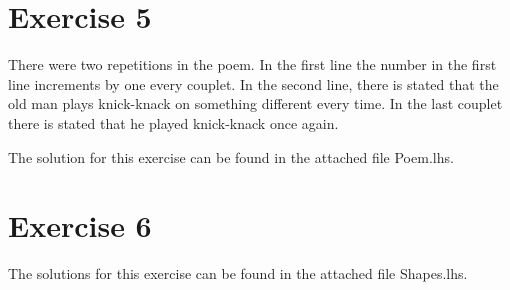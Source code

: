 \documentclass{article}
\begin{document}
\section*{Exercise 5}
There were two repetitions in the poem. In the first line the number in the first line increments by one every couplet. In the second line, there is stated that the old man plays knick-knack on something different every time. In the last couplet there is stated that he played knick-knack once again.

The solution for this exercise can be found in the attached file Poem.lhs.

\section*{Exercise 6}
The solutions for this exercise can be found in the attached file Shapes.lhs.
\end{document}
